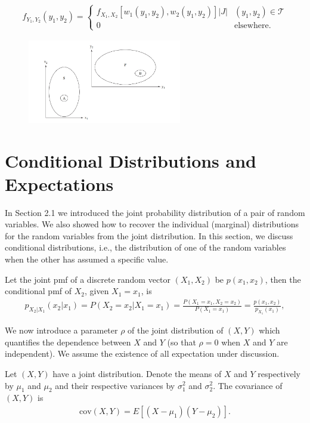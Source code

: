 \begin{align*}
    f_{Y_1,Y_2}(y_1,y_2) = \left\{\begin{matrix}
       f_{X_1,X_2}[w_1(y_1,y_2),w_2(y_1,y_2)]|J|& (y_1,y_2)\in\mathcal{T} \\
        0 & \text{elsewhere}.
       \end{matrix}\right.
\end{align*}

\begin{figure}[htbp]
    \centering
    \includegraphics[width=0.6\textwidth]{figure/transformation_S_T.png}
    \caption{}
    \label{fig:transformation_S_T}
\end{figure}


\section{Conditional Distributions and Expectations}
In Section 2.1 we introduced the joint probability distribution of a pair of random
variables. We also showed how to recover the individual (marginal) distributions
for the random variables from the joint distribution. In this section, we discuss
conditional distributions, i.e., the distribution of one of the random variables when
the other has assumed a specific value.

Let the joint pmf of a discrete random vector $(X_1,X_2)$ be $p(x_1,x_2)$,
then the conditional pmf of $X_2$, given $X_1=x_1$, is
\begin{align*}
    p_{X_2|X_1}(x_2|x_1) = P(X_2=x_2|X_1=x_1)=\frac{P(X_1=x_1,X_2=x_2)}{P(X_1=x_1)}=\frac{p(x_1,x_2)}{p_{X_1}(x_1)},
\end{align*}


We now introduce a parameter $\rho$ of the joint distribution of $(X,Y)$ 
which quantifies the dependence between $X$ and $Y$ (so that $\rho=0$ when $X$ and $Y$ are independent).
We assume the existence of all expectation under discussion.

\begin{definition}{}{}
    Let $(X,Y)$ have a joint distribution. Denote the means of $X$ and $Y$
    respectively by $\mu_1$ and $\mu_2$ and their respective variances by $\sigma_1^2$ and $\sigma_2^2$.
    The covariance of $(X,Y)$ is 
    \begin{align*}
        \text{cov}(X,Y) = E[(X-\mu_1)(Y-\mu_2)].
    \end{align*}
\end{definition}

